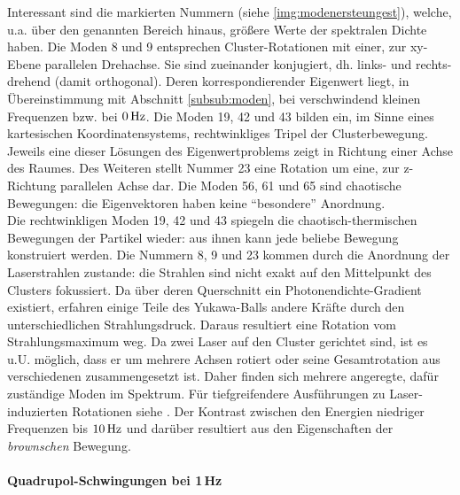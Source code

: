 \documentclass[numbers=noenddot,a4paper,notitlepage,twoside,BCOR15mm]{scrbook}
\newcommand{\tilt}[1]{\textit{#1}}
\begin{document}
				Interessant sind die markierten Nummern (siehe \ref{img:modenersteungest}), welche, u.a. über den genannten Bereich hinaus, größere Werte der spektralen Dichte haben. Die Moden 8 und 9 entsprechen Cluster-Rotationen mit einer, zur xy-Ebene parallelen  Drehachse. Sie sind zueinander konjugiert, dh. links- und rechts-drehend (damit orthogonal). Deren korrespondierender Eigenwert liegt, in Übereinstimmung mit Abschnitt \ref{subsub:moden}, bei verschwindend kleinen Frequenzen bzw. bei $\unit[0]{Hz}$. Die Moden 19, 42 und 43 bilden ein, im Sinne eines kartesischen Koordinatensystems, rechtwinkliges Tripel der Clusterbewegung. Jeweils eine dieser Lösungen des Eigenwertproblems zeigt in Richtung einer Achse des Raumes. Des Weiteren stellt Nummer 23 eine Rotation um eine, zur z-Richtung parallelen Achse dar. Die Moden 56, 61 und 65 sind chaotische Bewegungen: die Eigenvektoren haben keine "`besondere"' Anordnung.\\
				Die rechtwinkligen Moden 19, 42 und 43 spiegeln die chaotisch-thermischen Bewegungen der Partikel wieder: aus ihnen kann jede beliebe Bewegung konstruiert werden. Die Nummern 8, 9 und 23 kommen durch die Anordnung der Laserstrahlen zustande: die Strahlen sind nicht exakt auf den Mittelpunkt des Clusters fokussiert. Da über deren Querschnitt ein Photonendichte-Gradient existiert, erfahren einige Teile des Yukawa-Balls andere Kräfte durch den unterschiedlichen Strahlungsdruck. Daraus resultiert eine Rotation vom Strahlungsmaximum weg. Da zwei Laser auf den Cluster gerichtet sind, ist es u.U. möglich, dass er um mehrere Achsen rotiert oder seine Gesamtrotation aus verschiedenen zusammengesetzt ist. Daher finden sich mehrere angeregte, dafür zuständige Moden im Spektrum. Für tiefgreifendere Ausführungen zu Laser-induzierten Rotationen siehe \cite{Mulsow13}. Der Kontrast zwischen den Energien niedriger Frequenzen bis $\unit[10]{Hz}$ und darüber resultiert aus den Eigenschaften der \tilt{brownschen} Bewegung.

					\paragraph{Quadrupol-Schwingungen bei 1\,Hz}
\end{document}
